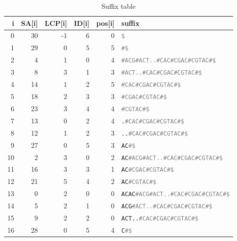 \begin{table*}
    \caption{Suffix table}
    \label{tab:suffix}
    \begin{tabular}{rrrrrl}
        \toprule
        i & SA[i] & LCP[i] & ID[i] & pos[i] & suffix\\
        \midrule
         0  & 30 & -1 & 6 & 0 & \texttt{\textcolor{gray}{\$}}                                     \\
         1  & 29 &  0 & 5 & 5 & \texttt{\textcolor{gray}{\#\$}}                                   \\
         2  &  4 &  1 & 0 & 4 & \texttt{\textcolor{gray}{\#ACG\#ACT..\#CAC\#CGAC\#CGTAC\#\$}}     \\
         3  &  8 &  3 & 1 & 3 & \texttt{\textcolor{gray}{\#ACT..\#CAC\#CGAC\#CGTAC\#\$}}          \\
         4  & 14 &  1 & 2 & 5 & \texttt{\textcolor{gray}{\#CAC\#CGAC\#CGTAC\#\$}}                 \\
         5  & 18 &  2 & 3 & 3 & \texttt{\textcolor{gray}{\#CGAC\#CGTAC\#\$}}                      \\
         6  & 23 &  3 & 4 & 4 & \texttt{\textcolor{gray}{\#CGTAC\#\$}}                            \\
         7  & 13 &  0 & 2 & 4 & \texttt{.\textcolor{gray}{\#CAC\#CGAC\#CGTAC\#\$}}                \\
         8  & 12 &  1 & 2 & 3 & \texttt{..\textcolor{gray}{\#CAC\#CGAC\#CGTAC\#\$}}               \\
         9  & 27 &  0 & 5 & 3 & \texttt{AC\textcolor{gray}{\#\$}}                                 \\
        10  &  2 &  3 & 0 & 2 & \texttt{AC\textcolor{gray}{\#ACG\#ACT..\#CAC\#CGAC\#CGTAC\#\$}}   \\
        11  & 16 &  3 & 3 & 1 & \texttt{AC\textcolor{gray}{\#CGAC\#CGTAC\#\$}}                    \\
        12  & 21 &  5 & 4 & 2 & \texttt{AC\textcolor{gray}{\#CGTAC\#\$}}                          \\
        13  &  0 &  2 & 0 & 0 & \texttt{ACAC\textcolor{gray}{\#ACG\#ACT..\#CAC\#CGAC\#CGTAC\#\$}} \\
        14  &  5 &  2 & 1 & 0 & \texttt{ACG\textcolor{gray}{\#ACT..\#CAC\#CGAC\#CGTAC\#\$}}       \\
        15  &  9 &  2 & 2 & 0 & \texttt{ACT..\textcolor{gray}{\#CAC\#CGAC\#CGTAC\#\$}}            \\
        16  & 28 &  0 & 5 & 4 & \texttt{C\textcolor{gray}{\#\$}}                                  \\

\end{tabular}
\end{table*}
